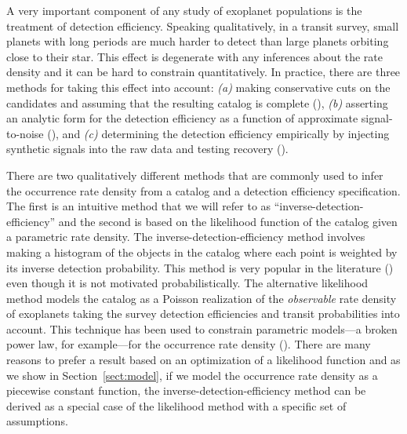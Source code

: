 \documentclass[12pt,preprint]{aastex}
\newcommand{\Sect}[1]{Section~\ref{sect:#1}}
\newcommand{\sect}[1]{\Sect{#1}}
\begin{document}
A very important component of any study of exoplanet populations is the
treatment of detection efficiency.
Speaking qualitatively, in a transit survey, small planets with long periods
are much harder to detect than large planets orbiting close to their star.
This effect is degenerate with any inferences about the rate density and it
can be hard to constrain quantitatively.
In practice, there are three methods for taking this effect into account:
\emph{(a)} making conservative cuts on the candidates and assuming that the
resulting catalog is complete (\citealt{catanzarite, traub, tremaine}),
\emph{(b)} asserting an analytic form for the detection efficiency as a
function of approximate signal-to-noise (\citealt{youdin, howard, dressing,
dong, fressin-fp, morton-swift}), and \emph{(c)} determining the detection
efficiency empirically by injecting synthetic signals into the raw data and
testing recovery (\citealt{petigura-a, petigura}).

There are two qualitatively different methods that are commonly used to infer
the occurrence rate density from a catalog and a detection efficiency
specification.
The first is an intuitive method that we will refer to as
``inverse-detection-efficiency'' and the second is based on the likelihood
function of the catalog given a parametric rate density.
The inverse-detection-efficiency method involves making a histogram of the
objects in the catalog where each point is weighted by its inverse detection
probability.
This method is very popular in the literature (\citealt{howard, dong,
dressing, swift, petigura}) even though it is not motivated probabilistically.
The alternative likelihood method models the catalog as a Poisson realization
of the \emph{observable} rate density of exoplanets taking the survey
detection efficiencies and transit probabilities into account.
This technique has been used to constrain parametric models---a broken power
law, for example---for the occurrence rate density (\citealt{tabachnik,
youdin, dong}).
There are many reasons to prefer a result based on an optimization of a
likelihood function and as we show in \sect{model}, if we model the occurrence
rate density as a piecewise constant function, the
inverse-detection-efficiency method can be derived as a special case of the
likelihood method with a specific set of assumptions.
\end{document}
